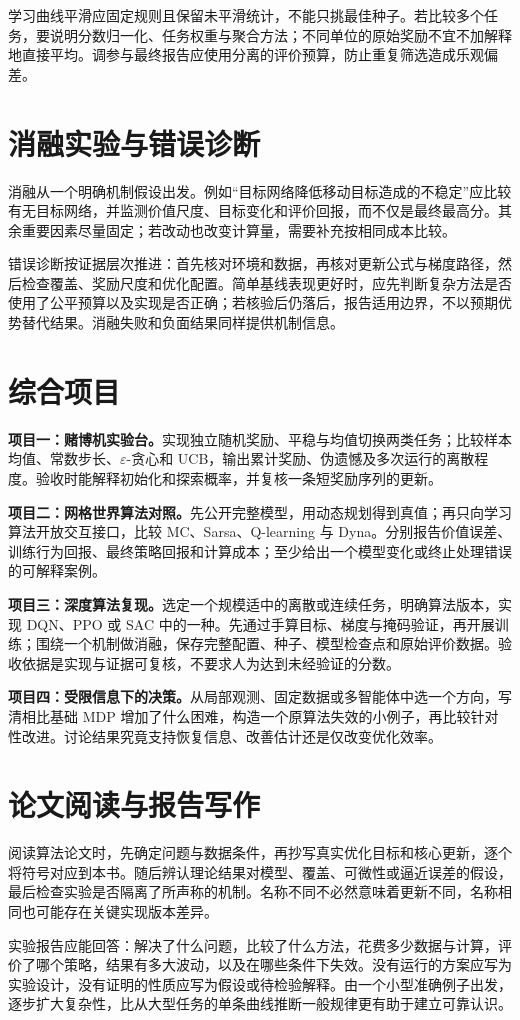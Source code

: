 学习曲线平滑应固定规则且保留未平滑统计，不能只挑最佳种子。若比较多个任务，要说明分数归一化、任务权重与聚合方法；不同单位的原始奖励不宜不加解释地直接平均。调参与最终报告应使用分离的评价预算，防止重复筛选造成乐观偏差。

\section{消融实验与错误诊断}

消融从一个明确机制假设出发。例如“目标网络降低移动目标造成的不稳定”应比较有无目标网络，并监测价值尺度、目标变化和评价回报，而不仅是最终最高分。其余重要因素尽量固定；若改动也改变计算量，需要补充按相同成本比较。

错误诊断按证据层次推进：首先核对环境和数据，再核对更新公式与梯度路径，然后检查覆盖、奖励尺度和优化配置。简单基线表现更好时，应先判断复杂方法是否使用了公平预算以及实现是否正确；若核验后仍落后，报告适用边界，不以预期优势替代结果。消融失败和负面结果同样提供机制信息。

\section{综合项目}

\textbf{项目一：赌博机实验台。}实现独立随机奖励、平稳与均值切换两类任务；比较样本均值、常数步长、$\varepsilon$-贪心和 UCB，输出累计奖励、伪遗憾及多次运行的离散程度。验收时能解释初始化和探索概率，并复核一条短奖励序列的更新。

\textbf{项目二：网格世界算法对照。}先公开完整模型，用动态规划得到真值；再只向学习算法开放交互接口，比较 MC、Sarsa、Q-learning 与 Dyna。分别报告价值误差、训练行为回报、最终策略回报和计算成本；至少给出一个模型变化或终止处理错误的可解释案例。

\textbf{项目三：深度算法复现。}选定一个规模适中的离散或连续任务，明确算法版本，实现 DQN、PPO 或 SAC 中的一种。先通过手算目标、梯度与掩码验证，再开展训练；围绕一个机制做消融，保存完整配置、种子、模型检查点和原始评价数据。验收依据是实现与证据可复核，不要求人为达到未经验证的分数。

\textbf{项目四：受限信息下的决策。}从局部观测、固定数据或多智能体中选一个方向，写清相比基础 MDP 增加了什么困难，构造一个原算法失效的小例子，再比较针对性改进。讨论结果究竟支持恢复信息、改善估计还是仅改变优化效率。

\section{论文阅读与报告写作}

阅读算法论文时，先确定问题与数据条件，再抄写真实优化目标和核心更新，逐个将符号对应到本书。随后辨认理论结果对模型、覆盖、可微性或逼近误差的假设，最后检查实验是否隔离了所声称的机制。名称不同不必然意味着更新不同，名称相同也可能存在关键实现版本差异。

实验报告应能回答：解决了什么问题，比较了什么方法，花费多少数据与计算，评价了哪个策略，结果有多大波动，以及在哪些条件下失效。没有运行的方案应写为实验设计，没有证明的性质应写为假设或待检验解释。由一个小型准确例子出发，逐步扩大复杂性，比从大型任务的单条曲线推断一般规律更有助于建立可靠认识。



